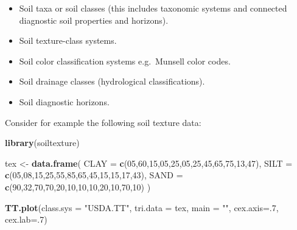\documentclass[10pt,b5paper,]{book}
\newenvironment{Shaded}{\begin{snugshade}}{\end{snugshade}}
\newcommand{\DataTypeTok}[1]{\textcolor[rgb]{0.13,0.29,0.53}{#1}}
\newcommand{\DecValTok}[1]{\textcolor[rgb]{0.00,0.00,0.81}{#1}}
\newcommand{\KeywordTok}[1]{\textcolor[rgb]{0.13,0.29,0.53}{\textbf{#1}}}
\newcommand{\NormalTok}[1]{#1}
\newcommand{\StringTok}[1]{\textcolor[rgb]{0.31,0.60,0.02}{#1}}
\providecommand{\tightlist}{%
  \setlength{\itemsep}{0pt}\setlength{\parskip}{0pt}}
\theoremstyle{definition}
\theoremstyle{definition}
\theoremstyle{definition}
\theoremstyle{remark}
\begin{document}
\begin{itemize}
\tightlist
\item
  Soil taxa or soil classes (this includes taxonomic systems and
  connected diagnostic soil properties and horizons).
\item
  Soil texture-class systems.
\item
  Soil color classification systems e.g.~Munsell color codes.
\item
  Soil drainage classes (hydrological classifications).
\item
  Soil diagnostic horizons.
\end{itemize}

Consider for example the following soil texture data:

\begin{Shaded}
\begin{Highlighting}[]
\KeywordTok{library}\NormalTok{(soiltexture)}

\NormalTok{tex <-}\StringTok{ }\KeywordTok{data.frame}\NormalTok{(}
  \DataTypeTok{CLAY =} \KeywordTok{c}\NormalTok{(}\DecValTok{05}\NormalTok{,}\DecValTok{60}\NormalTok{,}\DecValTok{15}\NormalTok{,}\DecValTok{05}\NormalTok{,}\DecValTok{25}\NormalTok{,}\DecValTok{05}\NormalTok{,}\DecValTok{25}\NormalTok{,}\DecValTok{45}\NormalTok{,}\DecValTok{65}\NormalTok{,}\DecValTok{75}\NormalTok{,}\DecValTok{13}\NormalTok{,}\DecValTok{47}\NormalTok{),}
  \DataTypeTok{SILT =} \KeywordTok{c}\NormalTok{(}\DecValTok{05}\NormalTok{,}\DecValTok{08}\NormalTok{,}\DecValTok{15}\NormalTok{,}\DecValTok{25}\NormalTok{,}\DecValTok{55}\NormalTok{,}\DecValTok{85}\NormalTok{,}\DecValTok{65}\NormalTok{,}\DecValTok{45}\NormalTok{,}\DecValTok{15}\NormalTok{,}\DecValTok{15}\NormalTok{,}\DecValTok{17}\NormalTok{,}\DecValTok{43}\NormalTok{),}
  \DataTypeTok{SAND =} \KeywordTok{c}\NormalTok{(}\DecValTok{90}\NormalTok{,}\DecValTok{32}\NormalTok{,}\DecValTok{70}\NormalTok{,}\DecValTok{70}\NormalTok{,}\DecValTok{20}\NormalTok{,}\DecValTok{10}\NormalTok{,}\DecValTok{10}\NormalTok{,}\DecValTok{10}\NormalTok{,}\DecValTok{20}\NormalTok{,}\DecValTok{10}\NormalTok{,}\DecValTok{70}\NormalTok{,}\DecValTok{10}\NormalTok{)}
\NormalTok{ )}
 
\KeywordTok{TT.plot}\NormalTok{(}\DataTypeTok{class.sys =} \StringTok{"USDA.TT"}\NormalTok{, }\DataTypeTok{tri.data =}\NormalTok{ tex, }\DataTypeTok{main =} \StringTok{""}\NormalTok{, }
        \DataTypeTok{cex.axis=}\NormalTok{.}\DecValTok{7}\NormalTok{, }\DataTypeTok{cex.lab=}\NormalTok{.}\DecValTok{7}\NormalTok{)}
\end{Highlighting}
\end{Shaded}
\end{document}
